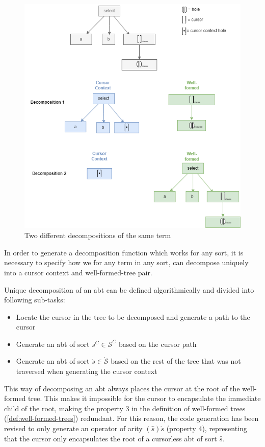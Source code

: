 \begin{figure}[H]
  \centering
  \includegraphics[width=\textwidth]{img/slq-decompose-ex.drawio.png}
  \caption{Two different decompositions of the same term}
  \label{fig:sql-decomp-ex}
\end{figure}

In order to generate a decomposition function which works for any sort,
it is necessary to specify how we for any term in any sort,
can decompose uniquely into a cursor context and well-formed-tree pair.

Unique decomposition of an abt can be defined algorithmically and divided
into following sub-tasks:
\begin{itemize}
  \item Locate the cursor in the tree to be decomposed and generate a path to the cursor
  \item Generate an abt of sort $s^C \in \mathcal{S}^C$ based on the cursor path
  \item Generate an abt of sort $\dot{s} \in \dot{\mathcal{S}}$
        based on the rest of the tree that was not traversed
        when generating the cursor context
\end{itemize}

This way of decomposing an abt always places the cursor at the root of the
well-formed tree. This makes it impossible for the cursor to encapsulate the immediate
child of the root, making the property 3 in the definition of well-formed trees
(\cref{def:well-formed-trees}) redundant. For this reason, the code generation
has been revised to only generate an operator of arity $(\hat{s})\dot{s}$ (property 4),
representing that the cursor only encapsulates the root of a cursorless abt
of sort $\hat{s}$.

